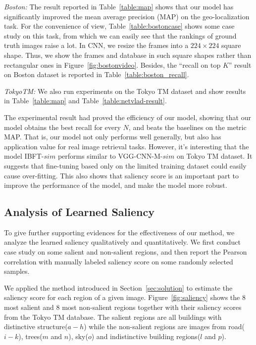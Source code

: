\emph{Boston: }
The result reported in Table~\ref{table:map} shows that our model has significantly improved the mean average precision (MAP) on the geo-localization task. For the convenience of view, Table~\ref{table:bostoncase} shows some case study on this task, from which we can easily see that the rankings of ground truth images raise a lot. In CNN, we resize the frames into a $224 \times 224$ square shape. Thus, we show the frames and database in such square shapes rather than rectangular ones in Figure~\ref{fig:bostonvideo}. Besides, the ``recall on top $K$'' result on Boston dataset is reported in Table~\ref{table:boston_recall}.

\emph{TokyoTM: }
We also run experiments on the Tokyo TM dataset and show results in Table~\ref{table:map} and Table~\ref{table:netvlad-result}. 

The experimental result had proved the efficiency of our model, showing that our model obtains the best recall for every $N$, and beats the baselines on the metric MAP. That is, our model not only performs well generally, but also has application value for real image retrieval tasks. However, it's interesting that the model IBFT-$sim$ performs  similar to VGG-CNN-M-$sim$ on Tokyo TM dataset. It suggests that fine-tuning based only on the limited training dataset could easily cause over-fitting. This also shows that saliency score is an important part to improve the performance of the model, and make the model more robust.

\subsection{Analysis of Learned Saliency}
To give further supporting evidences for the effectiveness of our method, we analyze the learned saliency qualitatively and quantitatively. 
We first conduct case study on some salient and non-salient regions, and then report the Pearson correlation with manually labeled saliency score on some randomly selected samples.

We applied the method introduced in Section~\ref{sec:solution} to estimate the saliency score for each region of a given image. 
Figure~\ref{fig:saliency} shows the 8 most salient and 8 most non-salient regions together with their saliency scores from the Tokyo TM database. 
The salient regions are all buildings with distinctive structure($a-h$) while the non-salient regions are images from road($i-k$), trees($m$ and $n$), sky($o$) and indistinctive building regions($l$ and $p$). 



